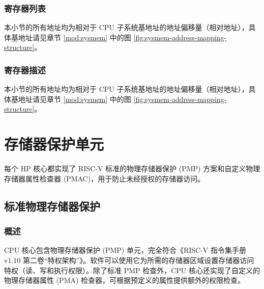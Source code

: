 \documentclass[main\_\_CN.tex]{subfiles}
\begin{document}

\hypertarget{riscvcpu-clint-reg-summ}{}
\subsubsection{寄存器列表}
\label{sec:riscvcpu-clint-reg-summ}

本小节的所有地址均为相对于 CPU 子系统基地址的地址偏移量（相对地址），具体基地址请见章节 \ref{mod:sysmem} \textit{} 中的图 \ref{fig:sysmem-address-mapping-structure}。




\subsubsection{寄存器描述}

本小节的所有地址均为相对于 CPU 子系统基地址的地址偏移量（相对地址），具体基地址请见章节 \ref{mod:sysmem} \textit{} 中的图 \ref{fig:sysmem-address-mapping-structure}。



\newpage
\section{存储器保护单元}
每个 HP 核心都实现了 RISC-V 标准的物理存储器保护 (PMP) 方案和自定义物理存储器属性检查器 (PMAC)，用于防止未经授权的存储器访问。


\subsection{标准物理存储器保护}
\label{sec:riscvcpu-pmp}
\subsubsection{概述}
\label{sec:riscvcpu-pmp-overview}
CPU 核心包含物理存储器保护 (PMP) 单元，完全符合《RISC-V 指令集手册 v1.10 第二卷“特权架构”》。软件可以使用它为所需的存储器区域设置存储器访问特权（读、写和执行权限）。除了标准 PMP 检查外，CPU 核心还实现了自定义的物理存储器属性 (PMA) 检查器，可根据预定义的属性提供额外的权限检查。
\end{document}
